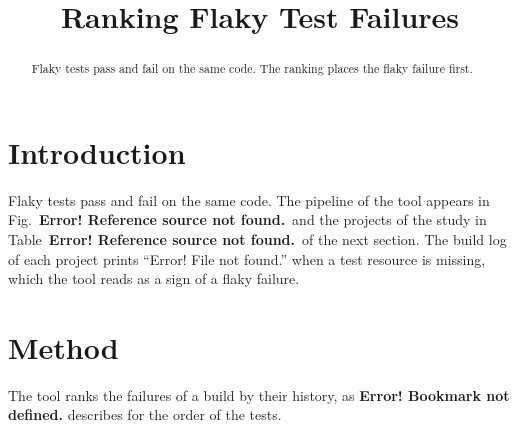\documentclass[conference]{IEEEtran}
\newcommand{\lost}{\textbf{Error! Reference source not found.}}
\begin{document}
\title{Ranking Flaky Test Failures}
\author{}
\maketitle
\begin{abstract}
Flaky tests pass and fail on the same code. The ranking places the flaky failure first.
\end{abstract}
\section{Introduction}
Flaky tests pass and fail on the same code. The pipeline of the tool appears in Fig.~\lost\ and
the projects of the study in Table~\lost\ of the next section. The build log of each project
prints ``Error! File not found.'' when a test resource is missing, which the tool reads as a
sign of a flaky failure.
\section{Method}
The tool ranks the failures of a build by their history, as \textbf{Error! Bookmark not defined.}
describes for the order of the tests.
\end{document}
